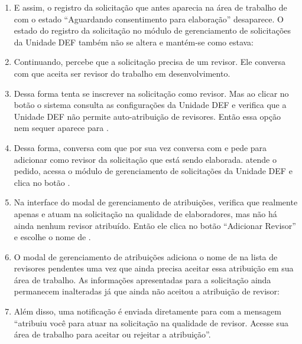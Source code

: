 \begin{landscape}
\begin{enumerate}
	\item E assim, o registro da solicitação que antes aparecia na área de trabalho de \EQ com o estado ``Aguardando consentimento para elaboração'' desaparece. O estado do registro da solicitação no módulo de gerenciamento de solicitações da Unidade DEF também não se altera e mantém-se como estava:
	
	
	\item Continuando, \ED percebe que a solicitação precisa de um revisor. Ele conversa com \RU que aceita ser revisor do trabalho em desenvolvimento.
	
	\item Dessa forma \RU tenta se inscrever na solicitação como revisor. Mas ao clicar no botão \bInscrever o sistema consulta as configurações da Unidade DEF e verifica que a Unidade DEF não permite auto-atribuição de revisores. Então essa opção nem sequer aparece para \RU.  
	
	\item Dessa forma, \RU conversa com \ED que por sua vez conversa com \SC e pede para adicionar \RU como revisor da solicitação que está sendo elaborada. \SC atende o pedido, acessa o módulo de gerenciamento de solicitações da Unidade DEF e clica no botão \bGerAtrib.
	
	\item Na interface do modal de gerenciamento de atribuições, \SC verifica que realmente apenas \EU e \ED atuam na solicitação na qualidade de elaboradores, mas não há ainda nenhum revisor atribuído. Então ele clica no botão ``Adicionar Revisor'' e escolhe o nome de \RU.
	
	\item O modal de gerenciamento de atribuições adiciona o nome de \RU na lista de revisores pendentes uma vez que \RU ainda precisa aceitar essa atribuição em sua área de trabalho. As informações apresentadas para a solicitação \SOLT ainda permanecem inalteradas já que \RU ainda não aceitou a atribuição de revisor:
	
	
	\item Além disso, uma notificação é enviada diretamente para \RU com a mensagem ``\SC atribuiu você para atuar na solicitação \SOLT na qualidade de revisor. Acesse sua área de trabalho para aceitar ou rejeitar a atribuição''.
	

\end{enumerate}
\end{landscape}

